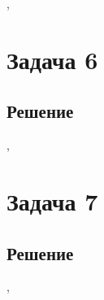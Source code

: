 \documentclass[a4paper,12pt]{article}
\begin{document}
	

	\sep	
		
		
	\section*{Задача 6}

	
	\subsection*{Решение}
	


	\sep		
	
	
	
	
	\section*{Задача 7}

	
	\subsection*{Решение}
	


	\sep	
	
	
	
	
\end{document}
